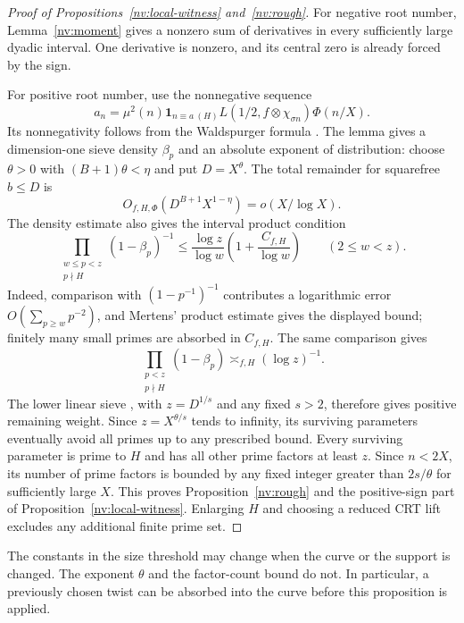 \begin{proof}[Proof of Propositions~\ref{nv:local-witness} and~\ref{nv:rough}]
For negative root number, Lemma~\ref{nv:moment} gives a nonzero sum of
derivatives in every sufficiently large dyadic interval. One derivative
is nonzero, and its central zero is already forced by the sign.

For positive root number, use the nonnegative sequence
\[
 a_n=\mu^2(n)\mathbf1_{n\equiv a\ (H)}
      L(1/2,f\otimes\chi_{\sigma n})\Phi(n/X).
\]
Its nonnegativity follows from the Waldspurger formula
\cite{Waldspurger1981}. The lemma gives a dimension-one sieve density
$\beta_p$ and an absolute exponent of distribution:
choose $\theta>0$ with $(B+1)\theta<\eta$ and put $D=X^\theta$.
The total remainder for squarefree $b\le D$ is
\[
 O_{f,H,\Phi}(D^{B+1}X^{1-\eta})=o(X/\log X).
\]
The density estimate also gives the interval product condition
\[
 \prod_{\substack{w\le p<z\\p\nmid H}}(1-\beta_p)^{-1}
 \le \frac{\log z}{\log w}
       \left(1+\frac{C_{f,H}}{\log w}\right)
 \qquad(2\le w<z).
\]
Indeed, comparison with $(1-p^{-1})^{-1}$ contributes a logarithmic
error $O(\sum_{p\ge w}p^{-2})$, and Mertens' product estimate gives
the displayed bound; finitely many small primes are absorbed in
$C_{f,H}$.  The same comparison gives
\[
 \prod_{\substack{p<z\\p\nmid H}}(1-\beta_p)\asymp_{f,H}(\log z)^{-1}.
\]
The lower linear sieve \cite[Theorem~11.13]{FriedlanderIwaniec2010},
with $z=D^{1/s}$ and any fixed $s>2$, therefore gives positive
remaining weight. Since $z=X^{\theta/s}$ tends to infinity, its
surviving parameters eventually avoid all primes up to any prescribed bound.
Every surviving parameter is prime to $H$ and has all other prime
factors at least $z$. Since $n<2X$, its number of prime factors is
bounded by any fixed integer greater than $2s/\theta$ for sufficiently
large $X$. This proves Proposition~\ref{nv:rough} and the positive-sign
part of Proposition~\ref{nv:local-witness}. Enlarging $H$ and choosing
a reduced CRT lift excludes any additional finite prime set.
\end{proof}

The constants in the size threshold may change when the curve or
the support is changed. The exponent $\theta$ and the factor-count
bound do not. In particular, a previously chosen twist can be
absorbed into the curve before this proposition is applied.
